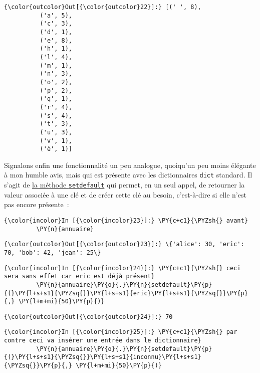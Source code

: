 \begin{Verbatim}[commandchars=\\\{\}]
{\color{outcolor}Out[{\color{outcolor}22}]:} [(' ', 8),
          ('a', 5),
          ('c', 3),
          ('d', 1),
          ('e', 8),
          ('h', 1),
          ('l', 4),
          ('m', 1),
          ('n', 3),
          ('o', 2),
          ('p', 2),
          ('q', 1),
          ('r', 4),
          ('s', 4),
          ('t', 3),
          ('u', 3),
          ('v', 1),
          ('è', 1)]
\end{Verbatim}
            
    Signalons enfin une fonctionnalité un peu analogue, quoiqu'un peu moins
élégante à mon humble avis, mais qui est présente avec les dictionnaires
\texttt{dict} standard. Il s'agit de
\href{https://docs.python.org/3/library/stdtypes.html\#dict.setdefault}{la
méthode \texttt{setdefault}} qui permet, en un seul appel, de retourner
la valeur associée à une clé et de créer cette clé au besoin,
c'est-à-dire si elle n'est pas encore présente~:

    \begin{Verbatim}[commandchars=\\\{\}]
{\color{incolor}In [{\color{incolor}23}]:} \PY{c+c1}{\PYZsh{} avant}
         \PY{n}{annuaire}
\end{Verbatim}


\begin{Verbatim}[commandchars=\\\{\}]
{\color{outcolor}Out[{\color{outcolor}23}]:} \{'alice': 30, 'eric': 70, 'bob': 42, 'jean': 25\}
\end{Verbatim}
            
    \begin{Verbatim}[commandchars=\\\{\}]
{\color{incolor}In [{\color{incolor}24}]:} \PY{c+c1}{\PYZsh{} ceci sera sans effet car eric est déjà présent}
         \PY{n}{annuaire}\PY{o}{.}\PY{n}{setdefault}\PY{p}{(}\PY{l+s+s1}{\PYZsq{}}\PY{l+s+s1}{eric}\PY{l+s+s1}{\PYZsq{}}\PY{p}{,} \PY{l+m+mi}{50}\PY{p}{)}
\end{Verbatim}


\begin{Verbatim}[commandchars=\\\{\}]
{\color{outcolor}Out[{\color{outcolor}24}]:} 70
\end{Verbatim}
            
    \begin{Verbatim}[commandchars=\\\{\}]
{\color{incolor}In [{\color{incolor}25}]:} \PY{c+c1}{\PYZsh{} par contre ceci va insérer une entrée dans le dictionnaire}
         \PY{n}{annuaire}\PY{o}{.}\PY{n}{setdefault}\PY{p}{(}\PY{l+s+s1}{\PYZsq{}}\PY{l+s+s1}{inconnu}\PY{l+s+s1}{\PYZsq{}}\PY{p}{,} \PY{l+m+mi}{50}\PY{p}{)}
\end{Verbatim}


